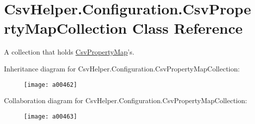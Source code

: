\hypertarget{a00068}{\section{Csv\-Helper.\-Configuration.\-Csv\-Property\-Map\-Collection Class Reference}
\label{a00068}
}


A collection that holds \hyperlink{a00067}{Csv\-Property\-Map}'s.  




Inheritance diagram for Csv\-Helper.\-Configuration.\-Csv\-Property\-Map\-Collection\-:
\nopagebreak
\begin{figure}[H]
\begin{center}
\leavevmode
\texttt{[image: a00462]}
\end{center}
\end{figure}


Collaboration diagram for Csv\-Helper.\-Configuration.\-Csv\-Property\-Map\-Collection\-:
\nopagebreak
\begin{figure}[H]
\begin{center}
\leavevmode
\texttt{[image: a00463]}
\end{center}
\end{figure}
